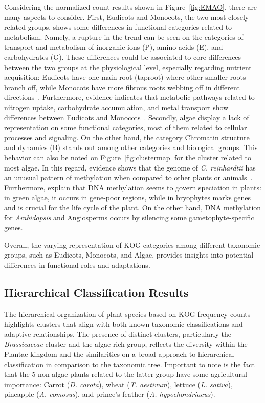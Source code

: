 Considering the normalized count results shown in 
Figure~\ref{fig:EMAO}, there are many aspects to consider.
First, Eudicots and Monocots, the two most closely 
related groups, shows some differences in functional 
categories related to metabolism. Namely, a rupture 
in the trend can be seen on 
the categories of transport and metabolism of inorganic ions 
(P), amino acids (E), and carbohydrates (G). These 
differences could be associated to core differences between 
the two groups at the physiological level, especially 
regarding nutrient acquisition: Eudicots have one main root 
(taproot) where other smaller roots branch off, while 
Monocots have more fibrous roots webbing off in different 
directions~\citep{freschet2021}. Furthermore, evidence 
indicates that metabolic pathways related to nitrogen 
uptake, carbohydrate accumulation, and metal 
transport show differences between Eudicots and 
Monocots~\citep{yang2020,tian2016}.
Secondly, algae display a lack of representation on some 
functional categories, most of them related to cellular 
processes and signaling. On the other hand, the category 
Chromatin structure and dynamics (B) stands out among other 
categories and biological groups. This behavior can also 
be noted on Figure~\ref{fig:clustermap} for the cluster
related to most algae.
In this regard, evidence shows that the genome of \emph{C. 
reinhardtii} has an unusual pattern of methylation when compared 
to other plants or animals~\citep{bacova2020}. Furthermore, 
\cite{vigneau2021} explain that DNA methylation seems to govern 
speciation in plants: in green algae, it occurs in gene-poor 
regions, while in bryophytes marks genes and is crucial for the 
life cycle of the plant. On the other hand, DNA methylation for 
\emph{Arabidopsis} and Angiosperms occurs by silencing some 
gametophyte-specific genes.

Overall, the varying 
representation of KOG categories among different taxonomic 
groups, such as Eudicots, Monocots, and Algae, provides 
insights into potential differences in functional roles 
and adaptations.


\subsection{Hierarchical Classification Results}
\label{sec:conclusion.hierarchy}

The hierarchical organization of plant species based on 
KOG frequency counts highlights clusters that align with 
both known taxonomic classifications and adaptive 
relationships. The presence of distinct clusters, 
particularly the \emph{Brassicaceae} cluster and the 
algae-rich group, reflects the diversity within the 
Plantae kingdom and the similarities on a broad approach to
hierarchical classification in comparison to the taxonomic tree.
Important to note is the fact that the 5 non-algae plants related 
to the latter group have some agricultural importance: Carrot 
(\emph{D. carota}), wheat (\emph{T. aestivum}), lettuce 
(\emph{L. sativa}), pineapple (\emph{A. comosus}), and 
prince's-feather (\emph{A. hypochondriacus}).

